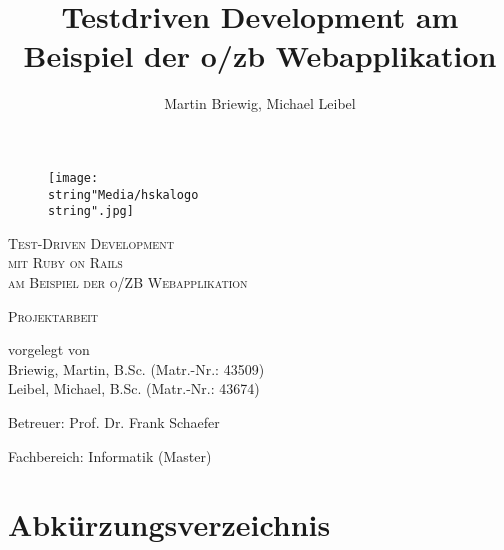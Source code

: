 \documentclass[12pt,             %
               a4paper,          %
               listof=totoc,     %
               index=totoc,      %
               bibliography=totoc,%
               oneside,         %
               BCOR1cm,          %
               english   %
               ]{scrbook}
\title{Testdriven Development am Beispiel der o/zb Webapplikation}
\author{Martin Briewig, Michael Leibel}
\begin{document}
\pagestyle{empty}
\begin{center}

\begin{figure}[h]
	\begin{center}
		\texttt{[image: \\string"Media/hskalogo\\string".jpg]}
	\end{center}
	\label{fig:hska_logo}
\end{figure} 

\vspace{5\baselineskip}

\textsc{\Huge Test-Driven Development\\ mit Ruby on Rails}\\[0.25cm]
\textsc{\large am Beispiel der o/ZB Webapplikation}\\[1.5cm]


\vspace{2\baselineskip}

\textsc{\LARGE Projektarbeit}\\[1.5cm]


\vspace{5\baselineskip}

vorgelegt von\\
Briewig, Martin, B.Sc. (Matr.-Nr.: 43509)\\
Leibel, Michael, B.Sc. (Matr.-Nr.: 43674)

\vspace{\baselineskip}

Betreuer: Prof. Dr. Frank Schaefer

Fachbereich: Informatik (Master)
\end{center}

\clearpage{}


\tableofcontents{}

\clearpage{}

\chapter*{Abkürzungsverzeichnis}

\begin{acronym}[SQL]
\end{acronym}

\newpage

\end{document}
